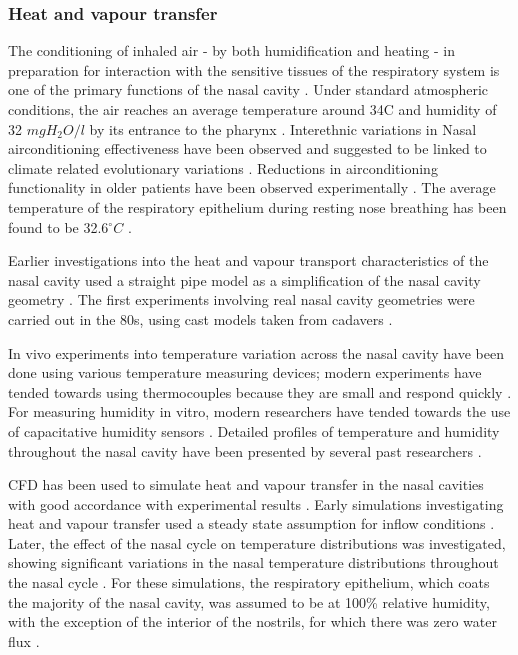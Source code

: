 \subsubsection{Heat and vapour transfer}

The conditioning of inhaled air - by both humidification and heating - in preparation for interaction with the sensitive tissues of the respiratory system is one of the primary functions of the nasal cavity \cite{Elad2008}.
Under standard atmospheric conditions, the air reaches an average temperature around 34\degree C and humidity of 32 $mg H_2 O/l$ by its entrance to the pharynx \cite{Keck2000}.
Interethnic variations in Nasal airconditioning effectiveness have been observed and suggested to be linked to climate related evolutionary variations \cite{Noback2011, Yokley2009}.
Reductions in airconditioning functionality in older patients have been observed experimentally \cite{Lindemann2008}.
The average temperature of the respiratory epithelium during resting nose breathing has been found to be 32.6$^{\circ} C$ \cite{Lindemann2002}.

Earlier investigations into the heat and vapour transport characteristics of the nasal cavity used a straight pipe model as a simplification of the nasal cavity geometry \cite{Ingelstedt1961}. The first experiments involving real nasal cavity geometries were carried out in the 80s, using cast models taken from cadavers \cite{Nuckols1983}.

In vivo experiments into temperature variation across the nasal cavity have been done using various temperature measuring devices; modern experiments have tended towards using thermocouples because they are small and respond quickly \cite{Elad2008}. For measuring humidity in vitro, modern researchers have tended towards the use of capacitative humidity sensors \cite{Keck2000}. Detailed profiles of temperature and humidity throughout the nasal cavity have been presented by several past researchers \cite{Keck2000}. 

CFD has been used to simulate heat and vapour transfer in the nasal cavities with good accordance with experimental results \cite{Lindemann2004}. Early simulations investigating heat and vapour transfer used a steady state assumption for inflow conditions \cite{Naftali1998}. Later, the effect of the nasal cycle on temperature distributions was investigated, showing significant variations in the nasal temperature distributions throughout the nasal cycle \cite{Elad2006}. For these simulations, the respiratory epithelium, which coats the majority of the nasal cavity, was assumed to be at 100\% relative humidity, with the exception of the interior of the nostrils, for which there was zero water flux \cite{Elad2006}.

